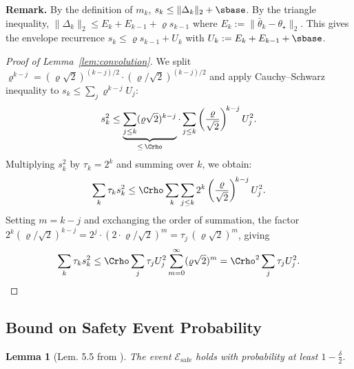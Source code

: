 \documentclass[11pt,journal,onecolumn]{IEEEtran}
\newtheorem{lemma}{Lemma}
\newcommand{\safe}{\mathrm{safe}}
\begin{document}
\noindent \textbf{Remark.} By the definition of $m_k$, $s_k \le \|\Delta_k\|_2 + \sbase$. By the triangle inequality, $\|\Delta_k\|_2 \le E_k + E_{k-1} + \varrho s_{k-1}$ where $E_k := \|\bar\theta_k - \theta_\star\|_2$. This gives the envelope recurrence $s_k \le \varrho s_{k-1} + U_k$ with $U_k := E_k + E_{k-1} + \sbase$.

\begin{proof}[Proof of Lemma~\ref{lem:convolution}]
    We split $\varrho^{k-j} = (\varrho\sqrt{2})^{(k-j)/2} \cdot (\varrho/\sqrt{2})^{(k-j)/2}$ and apply Cauchy--Schwarz inequality to $s_k \le \sum_j \varrho^{k-j} U_j$:
    \[
        s_k^2 \le \underbrace{\sum_{j \le k} (\varrho\sqrt{2})^{k-j}}_{\le\, \Crho} \cdot \sum_{j \le k} \left(\frac{\varrho}{\sqrt{2}}\right)^{\!k-j} U_j^2.
    \]
    Multiplying $s_k^2$ by $\tau_k = 2^k$ and summing over $k$, we obtain:
    \[
        \sum_k \tau_k s_k^2 \le \Crho \sum_k \sum_{j \le k} 2^k \left(\frac{\varrho}{\sqrt{2}}\right)^{\!k-j} U_j^2.
    \]
    Setting $m = k-j$ and exchanging the order of summation, the factor $2^k(\varrho/\sqrt{2})^{k-j} = 2^j \cdot (2 \cdot \varrho/\sqrt{2})^m = \tau_j\,(\varrho\sqrt{2})^m$, giving
    \[
        \sum_k \tau_k s_k^2 \le \Crho \sum_j \tau_j U_j^2 \sum_{m=0}^\infty (\varrho\sqrt{2})^m = \Crho^2 \sum_j \tau_j U_j^2.
    \]
\end{proof}

\subsection{Bound on Safety Event Probability}

\begin{lemma}[Lem. 5.5 from \cite{simchowitz20a}]
    The event $\mathcal{E}_\safe$ holds with probability at least $1 - \frac{\delta}{2}.$
\end{lemma}
\end{document}
